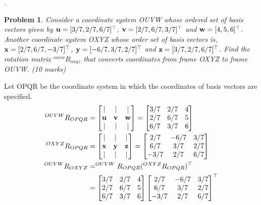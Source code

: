 \documentclass{article}
\newtheorem{prob}{Problem}
\begin{document}
\newpage
.
\newpage

\begin{prob}
  Consider a coordinate system OUVW whose ordered set of basis vectors given by
  $\mathbf{u} = [3/7, 2/7, 6/7]^\top$, $\mathbf{v} = [2/7, 6/7, 3/7]^\top$ and $\mathbf{w} = [4,
  5, 6]^\top$.
  Another coordinate system OXYZ whose order set of basis vectors is, $\mathbf{x} =
  [2/7, 6/7, -3/7]^\top$, $\mathbf{y} = [-6/7, 3/7, 2/7]^\top$ and $\mathbf{z} = [3/7, 2/7, 6/7]^\top$.
  Find the rotation matrix $^{ouvw}R_{oxyz}$ that converts coordinates from frame OXYZ to frame OUVW. (10 marks)
\end{prob}

Let OPQR be the coordinate system in which the coordinates of basis vectors are specified.
\begin{align}
  ^{OUVW}R_{OPQR} &= \begin{bmatrix}
    | & | & | \\
    \mathbf{u} & \mathbf{v} & \mathbf{w} \\
    | & | & | \\
  \end{bmatrix}
    = \begin{bmatrix}
    3/7 & 2/7 & 4 \\
    2/7 & 6/7 & 5  \\
    6/7 & 3/7 & 6 \\
  \end{bmatrix} \\
  ^{OXYZ}R_{OPQR} &= \begin{bmatrix}
    | & | & | \\
    \mathbf{x} & \mathbf{y} & \mathbf{z} \\
    | & | & | \\
  \end{bmatrix}
  = \begin{bmatrix}
    2/7 & -6/7 & 3/7 \\
    6/7 & 3/7 & 2/7  \\
    -3/7 & 2/7 & 6/7 \\
  \end{bmatrix} \\
  ^{OUVW}R_{OXYZ} &= ^{OUVW}R_{OPQR} (^{OXYZ}R_{OPQR})^\top \\
&= \begin{bmatrix}
    3/7 & 2/7 & 4 \\
    2/7 & 6/7 & 5  \\
    6/7 & 3/7 & 6 \\
  \end{bmatrix}
\begin{bmatrix}
    2/7 & -6/7 & 3/7 \\
    6/7 & 3/7 & 2/7  \\
    -3/7 & 2/7 & 6/7 \\
  \end{bmatrix}^\top
\end{align}
\newpage
\end{document}
